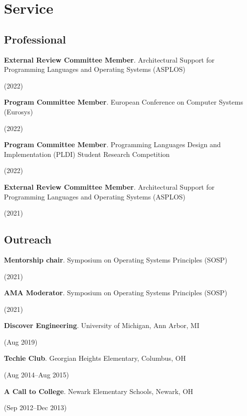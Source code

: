 \documentclass[letterpaper,10pt]{article}
\newcommand{\sidebyside}[2]{
  \begin{minipage}[t]{.75\textwidth}
    \raggedright{}
    #2
  \end{minipage}
  \hspace{.01\textwidth}
    \begin{minipage}[t]{.205\textwidth}
    \raggedleft
    #1
  \end{minipage}
}
\newcommand{\trio}[3]{\sidebyside{#3}{\textbf{#1}. #2}}
\begin{document}
\section{Service}
\subsection{Professional}
\begin{smenumerate}
\item\trio{External Review Committee Member}{Architectural Support for
  Programming Languages and Operating Systems (ASPLOS)}{(2022)}
\item\trio{Program Committee Member}{European Conference on Computer Systems (Eurosys)}{(2022)}
\item\trio{Program Committee Member}{Programming Languages Design and Implementation (PLDI) Student Research Competition}{(2022)}
\item\trio{External Review Committee Member}{Architectural Support for
  Programming Languages and Operating Systems (ASPLOS)}{(2021)}

\end{smenumerate}

\subsection{Outreach}
\begin{smenumerate}
\item\trio{Mentorship chair}{Symposium on Operating Systems Principles
  (SOSP)}{(2021)}
\item\trio{AMA Moderator}{Symposium on Operating Systems
  Principles (SOSP)}{(2021)}
\item\trio{Discover Engineering}{University of Michigan, Ann Arbor, MI}{(Aug 2019)}
\item\trio{Techie Club}{Georgian Heights Elementary, Columbus, OH}{(Aug 2014--Aug 2015)}
\item\trio{A Call to College}{Newark Elementary Schools, Newark, OH}{(Sep 2012--Dec 2013)}
\end{smenumerate}
\end{document}
